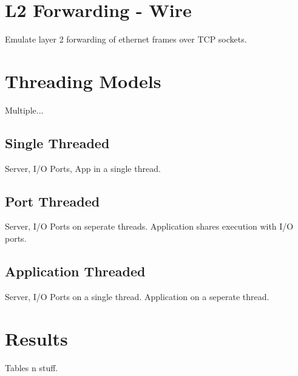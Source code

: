 \section{L2 Forwarding - Wire}
\label{expr:wire}
Emulate layer 2 forwarding of ethernet frames over TCP sockets.

\section{Threading Models}
\label{expr:models}
Multiple...

\subsection{Single Threaded}
\label{expr:models-single}
Server, I/O Ports, App in a single thread.

\subsection{Port Threaded}
\label{expr:models-port}
Server, I/O Ports on seperate threads. Application shares execution
with I/O ports.

\subsection{Application Threaded}
\label{expr:models-app}
Server, I/O Ports on a single thread. Application on a seperate thread.

\section{Results}
\label{expr:results}
Tables n stuff.

